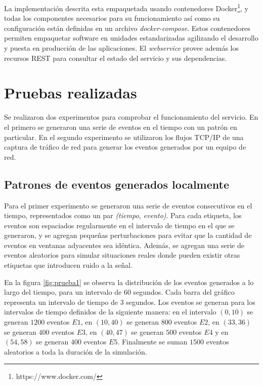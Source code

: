 \documentclass[a4paper,10pt, oneside]{article}
\begin{document}
La implementación descrita esta empaquetada usando contenedores Docker\footnote{https://www.docker.com/}, y todas los componentes necesarios para su funcionamiento así como su configuración están definidas en un archivo \textit{docker-compose}. Estos contenedores permiten empaquetar software en unidades estandarizadas agilizando el desarrollo y puesta en producción de las aplicaciones. El \textit{webservice} provee además los recursos REST para consultar el estado del servicio y sus dependencias.

\section{Pruebas realizadas}

Se realizaron dos experimentos para comprobar el funcionamiento del servicio. En el primero se generaron una serie de eventos en el tiempo con un patrón en particular. En el segundo experimento se utilizaron los flujos TCP/IP de una captura de tráfico de red para generar los eventos generados por un equipo de red. 

\subsection{Patrones de eventos generados localmente}
Para el primer experimento se generaron una serie de eventos consecutivos en el tiempo, representados como un par \textit{(tiempo, evento)}. Para cada etiqueta, los eventos son espaciados regularmente en el intervalo de tiempo en el que se generaron, y se agregan pequeñas perturbaciones para evitar que la cantidad de eventos en ventanas adyacentes sea idéntica. Además, se agregan una serie de eventos aleatorios para simular situaciones reales donde pueden existir otras etiquetas que introducen ruido a la señal.

En la figura \ref{fig:prueba1} se observa la distribución de los eventos generados a lo largo del tiempo, para un intervalo de 60 segundos. Cada barra del gráfico representa un intervalo de tiempo de $3$ segundos.
Los eventos se generan para los intervalos de tiempo definidos de la siguiente manera: en el intervalo $(0,10)$ se generan $1200$ eventos $E1$, en $(10,40)$ se generan $800$ eventos $E2$, en $(33,36)$ se generan $400$ eventos $E3$, en $(40,47)$ se generan $500$ eventos $E4$ y en $(54,58)$ se generan $400$ eventos $E5$. Finalmente se suman $1500$ eventos aleatorios a toda la duración de la simulación. 
\end{document}
